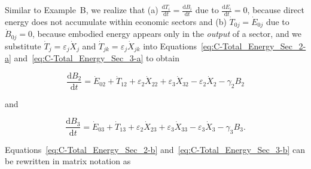\noindent{}Similar to Example~B, we realize that 
(a) $\frac{\mathrm{d}T_i}{\mathrm{d}t} = \frac{\mathrm{d}B_i}{\mathrm{d}t}$ 
due to $\frac{\mathrm{d}E_i}{\mathrm{d}t} = 0$, because direct energy
does not accumulate within economic sectors and
(b) $\dot{T}_{0j} = \dot{E}_{0j}$ due to $\dot{B}_{0j} = 0$, 
because embodied energy appears only in the \emph{output} of a sector, and
we substitute $\dot{T}_{j} = \varepsilon_{j} \dot{X}_{j}$ 
and $\dot{T}_{jk} = \varepsilon_{j} \dot{X}_{jk}$ 
into Equations~\ref{eq:C-Total_Energy_Sec_2-a}
and~\ref{eq:C-Total_Energy_Sec_3-a} to obtain

\begin{equation} \label{eq:C-Total_Energy_Sec_2-b}
	\frac{\mathrm{d}B_{2}}{\mathrm{d}t}
	= \dot{E}_{02}
	+ \dot{T}_{12}
	+ \varepsilon_{2} \dot{X}_{22}
	+ \varepsilon_{3} \dot{X}_{32}
	- \varepsilon_{2} \dot{X}_{2}
	- \gamma_{2} B_{2}
\end{equation}

\noindent{}and

\begin{equation} \label{eq:C-Total_Energy_Sec_3-b}
	\frac{\mathrm{d}B_{3}}{\mathrm{d}t}
	= \dot{E}_{03}
	+ \dot{T}_{13}
	+ \varepsilon_{2} \dot{X}_{23}
	+ \varepsilon_{3} \dot{X}_{33}
	- \varepsilon_{3} \dot{X}_{3}
	- \gamma_{3} B_{3}.
\end{equation}

\noindent{}Equations~\ref{eq:C-Total_Energy_Sec_2-b} 
and~\ref{eq:C-Total_Energy_Sec_3-b} can be rewritten 
in matrix notation as

